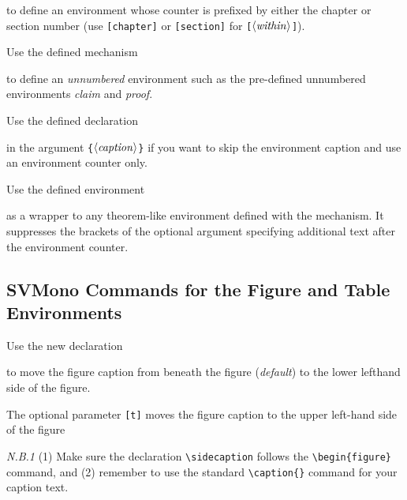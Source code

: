 \documentclass[graybox,square]{svmono}
\begin{document}
\begin{sloppy}
to define an environment whose counter is prefixed by either the chapter or section number (use \verb|[chapter]| or \verb|[section]| for \verb|[|$\langle {\it within}\rangle$\verb|]|).

Use the defined mechanism

\cprotect{}

to define an {\it unnumbered} environment such as the pre-defined unnumbered environments {\it claim} and {\it proof}.

\pagebreak

Use the defined declaration
\cprotect\boxtext{\verb|\nocaption|}

in the argument \verb|{|$\langle {\it caption}\rangle$\verb|}| if you want to skip the environment caption and use an environment counter only.

Use the defined environment
\cprotect{}

as a wrapper to any theorem-like environment defined with the mechanism. It suppresses the brackets of the optional argument specifying additional text after the environment counter.

\subsection{SVMono Commands for the Figure and Table Environments}

Use the new declaration

\cprotect{}

to move the figure caption from beneath the figure ({\it default}) to the lower lefthand side of the figure.

The optional parameter \verb|[t]| moves the figure caption to the upper left-hand side of the figure

{\it N.B.1} (1) Make sure the declaration \verb|\sidecaption| follows the \verb|\begin{figure}| command, and (2) remember to use the standard \verb|\caption{}| command for your caption text.


\end{sloppy}
\end{document}
